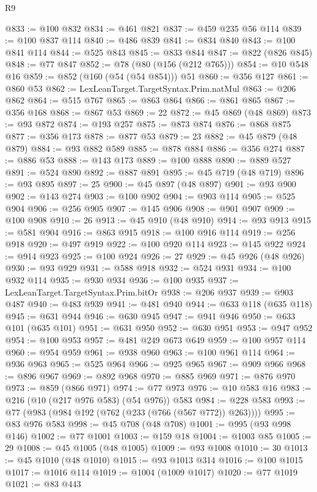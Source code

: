 \begin{lexlean}{R9}
\begin{coremodule}
@833 := @100 @832
@834 := @461 @821
@837 := @459 @235 @56 @114
@839 := @100 @837 @114
@840 := @486 @839
@841 := @834 @840
@843 := @100 @841 @114
@844 := @525 @843
@845 := @833 @844
@847 := @822 (@826 @845)
@848 := @77 @847
@852 := @78 (@80 (@156 (@212 @765)))
@854 := @10 @548 @16
@859 := @852 (@160 (@54 (@54 @854))) @51
@860 := @356 @127
@861 := @860 @53
@862 := LexLeanTarget.TargetSyntax.Prim.natMul
@863 := @206 @862
@864 := @515 @767
@865 := @863 @864
@866 := @861 @865
@867 := @356 @168
@868 := @867 @53
@869 := 22
@872 := @45 @869 (@48 @869)
@873 := @93 @872
@874 := @193 @257
@875 := @873 @874
@876 := @868 @875
@877 := @356 @173
@878 := @877 @53
@879 := 23
@882 := @45 @879 (@48 @879)
@884 := @93 @882 @589
@885 := @878 @884
@886 := @356 @274
@887 := @886 @53
@888 := @143 @173
@889 := @100 @888
@890 := @889 @527
@891 := @524 @890
@892 := @887 @891
@895 := @45 @719 (@48 @719)
@896 := @93 @895
@897 := 25
@900 := @45 @897 (@48 @897)
@901 := @93 @900
@902 := @143 @274
@903 := @100 @902
@904 := @903 @114
@905 := @525 @904
@906 := @256 @905
@907 := @145 @906
@908 := @901 @907
@909 := @100 @908
@910 := 26
@913 := @45 @910 (@48 @910)
@914 := @93 @913
@915 := @581 @904
@916 := @863 @915
@918 := @100 @916 @114
@919 := @256 @918
@920 := @497 @919
@922 := @100 @920 @114
@923 := @145 @922
@924 := @914 @923
@925 := @100 @924
@926 := 27
@929 := @45 @926 (@48 @926)
@930 := @93 @929
@931 := @588 @918
@932 := @524 @931
@934 := @100 @932 @114
@935 := @930 @934
@936 := @100 @935
@937 := LexLeanTarget.TargetSyntax.Prim.bitOr
@938 := @206 @937
@939 := @903 @487
@940 := @483 @939
@941 := @481 @940
@944 := @633 @118 (@635 @118)
@945 := @631 @944
@946 := @630 @945
@947 := @941 @946
@950 := @633 @101 (@635 @101)
@951 := @631 @950
@952 := @630 @951
@953 := @947 @952
@954 := @100 @953
@957 := @481 @249 @673 @649
@959 := @100 @957 @114
@960 := @954 @959
@961 := @938 @960
@963 := @100 @961 @114
@964 := @936 @963
@965 := @525 @964
@966 := @925 @965
@967 := @909 @966
@968 := @896 @967
@969 := @892 @968
@970 := @885 @969
@971 := @876 @970
@973 := @859 (@866 @971)
@974 := @77 @973
@976 := @10 @583 @16
@983 := @216 (@10 (@217 @976 @583) (@54 @976)) @583
@984 := @228 @583
@993 := @77 (@983 (@984 @192 (@762 (@233 (@766 (@567 @772)) @263))))
@995 := @83 @976 @583
@998 := @45 @708 (@48 @708)
@1001 := @995 (@93 @998 @146)
@1002 := @77 @1001
@1003 := @159 @18
@1004 := @1003 @85
@1005 := 29
@1008 := @45 @1005 (@48 @1005)
@1009 := @93 @1008
@1010 := 30
@1013 := @45 @1010 (@48 @1010)
@1015 := @93 @1013 @314
@1016 := @100 @1015
@1017 := @1016 @114
@1019 := @1004 (@1009 @1017)
@1020 := @77 @1019
@1021 := @83 @443

\end{coremodule}
\end{lexlean}
